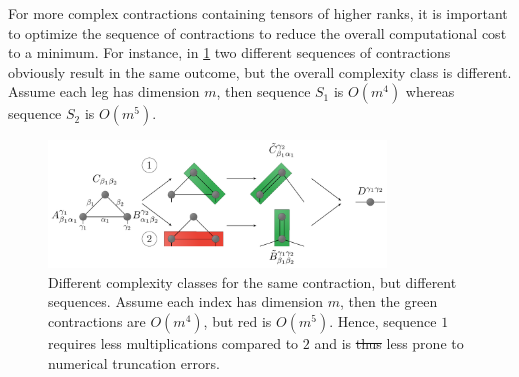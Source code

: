 \documentclass{svmono}
\providecommand{\DIFdeltex}[1]{{\protect\color{red}\sout{#1}}}                      %
\providecommand{\DIFdelFL}[1]{\DIFdel{#1}} %
\providecommand{\DIFdelbeginFL}{} %
\providecommand{\DIFdelendFL}{} %
\providecommand{\DIFdel}[1]{\texorpdfstring{\DIFdeltex{#1}}{}} %
\newcommand{\DIFscaledelfig}{0.5}
\newlength{\DIFdelgraphicswidth} %
\newlength{\DIFdelgraphicsheight} %
\newcommand{\DIFdelincludegraphics}[2][]{%
\sbox{\DIFdelgraphicsbox}{\DIFOincludegraphics[#1]{#2}}%
\settoboxwidth{\DIFdelgraphicswidth}{\DIFdelgraphicsbox} %
\settoboxtotalheight{\DIFdelgraphicsheight}{\DIFdelgraphicsbox} %
\scalebox{\DIFscaledelfig}{%
\parbox[b]{\DIFdelgraphicswidth}{\usebox{\DIFdelgraphicsbox}\\[-\baselineskip] \rule{\DIFdelgraphicswidth}{0em}}\llap{\resizebox{\DIFdelgraphicswidth}{\DIFdelgraphicsheight}{%
\setlength{\unitlength}{\DIFdelgraphicswidth}%
\begin{picture}(1,1)%
\thicklines\linethickness{2pt} %
{\color[rgb]{1,0,0}\put(0,0){\framebox(1,1){}}}%
{\color[rgb]{1,0,0}\put(0,0){\line( 1,1){1}}}%
{\color[rgb]{1,0,0}\put(0,1){\line(1,-1){1}}}%
\end{picture}%
}\hspace*{3pt}}} %
} %
\DeclareRobustCommand{\DIFdelbeginFL}{\DIFOdelbeginFL \let\includegraphics\DIFdelincludegraphics} %
\DeclareRobustCommand{\DIFdelendFL}{\DIFOaddendFL \let\includegraphics\DIFOincludegraphics} %
\begin{document}
For more complex contractions containing tensors of higher ranks, it is important to optimize the sequence of contractions to reduce the overall computational cost to a minimum.
For instance, in \cref{fig:contraction_sequences} two different sequences of contractions obviously result in the same outcome, but the overall complexity class is different.
Assume each leg has dimension $m$, then sequence $S_1$ is $O(m^4)$ whereas sequence $S_2$ is $O(m^5)$.
\begin{figure}
    \centering
    \includegraphics[width=0.8\textwidth]{figures/ComplexContraction1.pdf}
    \caption{Different complexity classes for the same contraction, but different sequences. Assume each index has dimension $m$, then the green contractions are $O(m^4)$, but red is $O(m^5)$. Hence, sequence $1$ requires less multiplications compared to $2$ and is \DIFdelbeginFL \DIFdelFL{thus }\DIFdelendFL less prone to numerical truncation errors.}
    \label{fig:contraction_sequences}
\end{figure}
\end{document}
